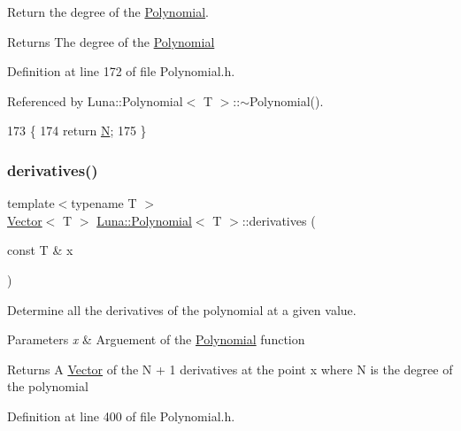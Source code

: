 Return the degree of the \hyperlink{classLuna_1_1Polynomial}{Polynomial}. 

\begin{DoxyReturn}{Returns}
The degree of the \hyperlink{classLuna_1_1Polynomial}{Polynomial} 
\end{DoxyReturn}


Definition at line 172 of file Polynomial.\+h.



Referenced by Luna\+::\+Polynomial$<$ T $>$\+::$\sim$\+Polynomial().


\begin{DoxyCode}
173     \{
174         \textcolor{keywordflow}{return} \hyperlink{namespaceHeat__plot_a7d050092798e28458a263710837bda77}{N};
175     \}
\end{DoxyCode}
\mbox{\label{classLuna_1_1Polynomial_a79cf4744896e8c226359f6258e621846}} 
\subsubsection{\texorpdfstring{derivatives()}{derivatives()}}
{\footnotesize\ttfamily template$<$typename T $>$ \\
\hyperlink{classLuna_1_1Vector}{Vector}$<$ T $>$ \hyperlink{classLuna_1_1Polynomial}{Luna\+::\+Polynomial}$<$ T $>$\+::derivatives (\begin{DoxyParamCaption}\item[{const T \&}]{x }\end{DoxyParamCaption})\hspace{0.3cm}{\ttfamily [inline]}}



Determine all the derivatives of the polynomial at a given value. 


\begin{DoxyParams}{Parameters}
{\em x} & Arguement of the \hyperlink{classLuna_1_1Polynomial}{Polynomial} function \\
\hline
\end{DoxyParams}
\begin{DoxyReturn}{Returns}
A \hyperlink{classLuna_1_1Vector}{Vector} of the N + 1 derivatives at the point x where N is the degree of the polynomial 
\end{DoxyReturn}


Definition at line 400 of file Polynomial.\+h.



